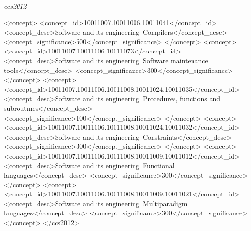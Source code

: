 \documentclass[acmsmall,review]{acmart}\settopmatter{printfolios=true,printccs=false,printacmref=false}
\def\resethooks{%
  \global\let\SaveRestoreHook\empty
  \global\let\ColumnHook\empty}
\let\hspre\empty
\let\hspost\empty
\newcommand{\id}[1]{\textsf{\textsl{#1}}}
\newcommand{\varid}[1]{\textcolor{Sepia}{\id{#1}}}
\begin{document}
\begin{CCSXML}
\begin{hscode}\SaveRestoreHook
\column{B}{@{}>{\hspre}l<{\hspost}@{}}%
\column{E}{@{}>{\hspre}l<{\hspost}@{}}%
\>[B]{}\varid{ccs2012}\mathbin{>}{}\<[E]%
\ColumnHook
\end{hscode}\resethooks
   <concept>
       <concept_id>10011007.10011006.10011041</concept_id>
       <concept_desc>Software and its engineering~Compilers</concept_desc>
       <concept_significance>500</concept_significance>
       </concept>
   <concept>
       <concept_id>10011007.10011006.10011073</concept_id>
       <concept_desc>Software and its engineering~Software maintenance tools</concept_desc>
       <concept_significance>300</concept_significance>
       </concept>
   <concept>
       <concept_id>10011007.10011006.10011008.10011024.10011035</concept_id>
       <concept_desc>Software and its engineering~Procedures, functions and subroutines</concept_desc>
       <concept_significance>100</concept_significance>
       </concept>
   <concept>
       <concept_id>10011007.10011006.10011008.10011024.10011032</concept_id>
       <concept_desc>Software and its engineering~Constraints</concept_desc>
       <concept_significance>300</concept_significance>
       </concept>
   <concept>
       <concept_id>10011007.10011006.10011008.10011009.10011012</concept_id>
       <concept_desc>Software and its engineering~Functional languages</concept_desc>
       <concept_significance>300</concept_significance>
       </concept>
   <concept>
       <concept_id>10011007.10011006.10011008.10011009.10011021</concept_id>
       <concept_desc>Software and its engineering~Multiparadigm languages</concept_desc>
       <concept_significance>300</concept_significance>
       </concept>
 </ccs2012>
\end{CCSXML}


\end{document}
